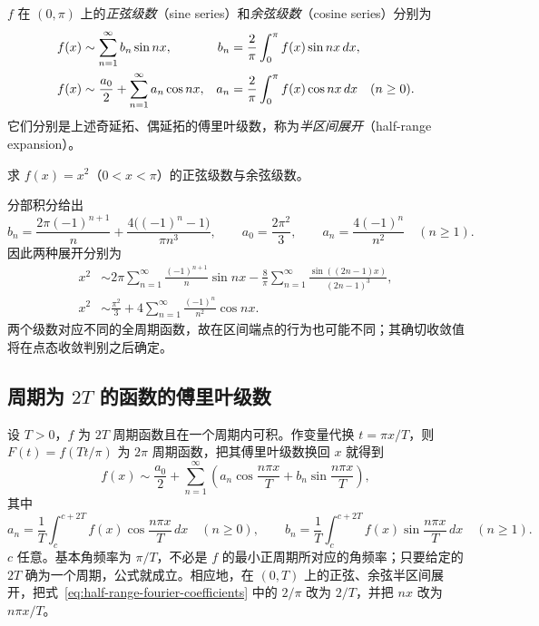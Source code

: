 \documentclass[UTF8,12pt,a4paper,fontset=fandol]{ctexbook}
\begin{document}
\begin{definition}
\label{def:half-range-fourier-expansions}
$f$ 在 $(0,\pi)$ 上的\emph{正弦级数}（sine series）和\emph{余弦级数}（cosine series）分别为
\begin{align}
    f(x)&\sim\sum_{n=1}^\infty b_n\sin nx,
       & b_n&=\frac2\pi\int_0^\pi f(x)\sin nx\,dx,\notag\\
    f(x)&\sim\frac{a_0}{2}+\sum_{n=1}^\infty a_n\cos nx,
       & a_n&=\frac2\pi\int_0^\pi f(x)\cos nx\,dx\quad(n\geq0).
    \label{eq:half-range-fourier-coefficients}
\end{align}
它们分别是上述奇延拓、偶延拓的傅里叶级数，称为\emph{半区间展开}（half-range expansion）。
\end{definition}

\begin{example}
\label{ex:half-range-fourier-square}
求 $f(x)=x^2$（$0<x<\pi$）的正弦级数与余弦级数。
\end{example}

\begin{solve}
分部积分给出
\[
    b_n=\frac{2\pi(-1)^{n+1}}n
           +\frac{4\bigl((-1)^n-1\bigr)}{\pi n^3},
    \qquad a_0=\frac{2\pi^2}{3},\qquad
    a_n=\frac{4(-1)^n}{n^2}\quad(n\geq1).
\]
因此两种展开分别为
\begin{align}
    x^2&\sim2\pi\sum_{n=1}^\infty\frac{(-1)^{n+1}}n\sin nx
       -\frac8\pi\sum_{n=1}^\infty
                    \frac{\sin((2n-1)x)}{(2n-1)^3},
       \label{eq:half-range-square-sine}\\
    x^2&\sim\frac{\pi^2}{3}
          +4\sum_{n=1}^\infty\frac{(-1)^n}{n^2}\cos nx.
       \label{eq:half-range-square-cosine}
\end{align}
两个级数对应不同的全周期函数，故在区间端点的行为也可能不同；其确切收敛值将在点态收敛判别之后确定。
\end{solve}

\subsection{周期为 \texorpdfstring{$2T$}{2T} 的函数的傅里叶级数}
\label{subsec:fourier-series-of-two-t-periodic-functions}

设 $T>0$，$f$ 为 $2T$ 周期函数且在一个周期内可积。作变量代换 $t=\pi x/T$，则 $F(t)=f(Tt/\pi)$ 为 $2\pi$ 周期函数，把其傅里叶级数换回 $x$ 就得到
\begin{equation}
    f(x)\sim\frac{a_0}{2}
       +\sum_{n=1}^\infty\left(
          a_n\cos\frac{n\pi x}{T}
          +b_n\sin\frac{n\pi x}{T}\right),
    \label{eq:fourier-series-general-period}
\end{equation}
其中
\begin{equation}
    a_n=\frac1T\int_c^{c+2T}f(x)\cos\frac{n\pi x}{T}\,dx\quad(n\geq0),
    \qquad
    b_n=\frac1T\int_c^{c+2T}f(x)\sin\frac{n\pi x}{T}\,dx\quad(n\geq1).
    \label{eq:fourier-coefficients-general-period}
\end{equation}
$c$ 任意。基本角频率为 $\pi/T$，不必是 $f$ 的最小正周期所对应的角频率；只要给定的 $2T$ 确为一个周期，公式就成立。相应地，在 $(0,T)$ 上的正弦、余弦半区间展开，把式~\eqref{eq:half-range-fourier-coefficients} 中的 $2/\pi$ 改为 $2/T$，并把 $nx$ 改为 $n\pi x/T$。
\end{document}
